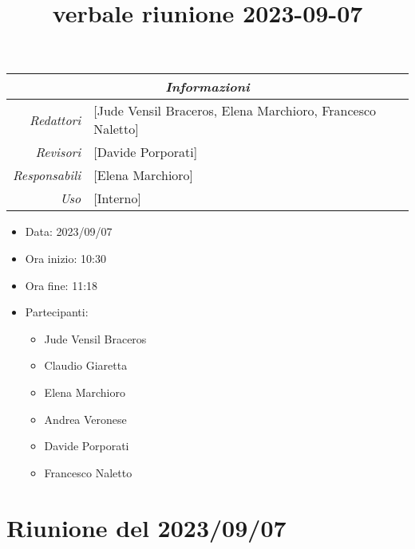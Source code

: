 \documentclass[12pt]{article}
\begin{document}
\graphicspath{ {../../templates/img} }

\title{verbale riunione 2023-09-07}

\firstPage
\maketitle

\begin{center}
\begin{tabular}{r | l}
    \multicolumn{2}{c}{\textit{Informazioni}}\\
    \hline
    
        \textit{Redattori} &
        [Jude Vensil Braceros, Elena Marchioro, Francesco Naletto]\makecell{}\\
    
        \textit{Revisori} &
        [Davide Porporati]\makecell{}\\
        \textit{Responsabili} &
        [Elena Marchioro]\makecell{}\\
            \textit{Uso} & 
            [Interno]\makecell{}\\
\end{tabular}
    \begin{itemize}
    \item[] Data: 2023/09/07
    \item[] Ora inizio: 10:30
    \item[] Ora fine: 11:18
    \item[] Partecipanti:
    \begin{itemize}
    \item[] Jude Vensil Braceros
    \item[] Claudio Giaretta
    \item[] Elena Marchioro
    \item[] Andrea Veronese
    \item[] Davide Porporati
    \item[] Francesco Naletto
    \end{itemize}
\end{itemize}
\end{center}


\tableofcontents
\printindex 
\section{Riunione del 2023/09/07}
\end{document}
